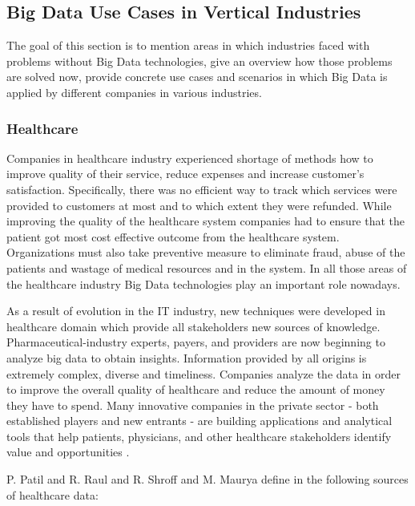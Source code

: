 \documentclass[runningheads]{llncs}
\begin{document}
\subsection{Big Data Use Cases in Vertical Industries}
The goal of this section is to mention areas in which industries faced with problems without Big Data technologies, give an overview how those problems are solved now, provide concrete use cases and scenarios in which Big Data is applied by different companies in various industries.

\subsubsection{Healthcare}

Companies in healthcare industry experienced shortage of methods how to improve quality of their service, reduce expenses and increase customer's satisfaction. Specifically, there was no efficient way to track which services were provided to customers at most and to which extent they were refunded. While improving the quality of the healthcare system companies had to ensure that the patient got most cost effective outcome from the healthcare system. Organizations must also take preventive measure to eliminate fraud, abuse of the patients and wastage of medical resources and in the system. In all those areas of the healthcare industry Big Data technologies play an important role nowadays.

As a result of evolution in the IT industry, new techniques were developed in healthcare domain which provide all stakeholders new sources of knowledge. Pharmaceutical-industry experts, payers, and providers are now beginning to analyze big data to obtain insights. Information provided by all origins is extremely complex, diverse and timeliness. Companies analyze the data in order to improve the overall quality of healthcare and reduce the amount of money they have to spend. Many innovative companies in the private sector - both established players and new entrants - are building applications and analytical tools that help patients, physicians, and other healthcare stakeholders identify value and opportunities \cite{USHEALTH}. 

P. Patil and R. Raul and R. Shroff and M. Maurya define in \cite{HEALTHARTICLE} the following sources of healthcare data:
\end{document}
